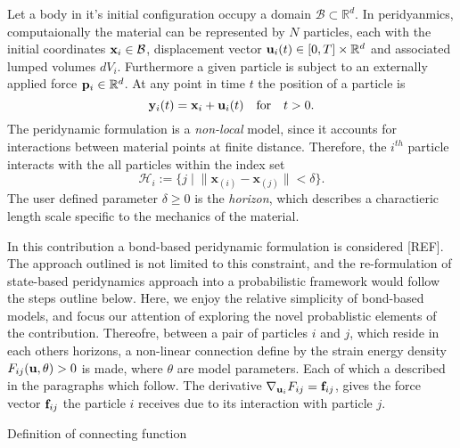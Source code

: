 \documentclass{article}
\begin{document}
\smallskip
Let a body in it's initial configuration occupy a domain $\mathcal B \subset \mathbb R^d$. In peridyanmics, computaionally the material can be represented by $N$ particles, each with the initial coordinates ${\bf x}_i \in \mathcal B$, displacement vector ${\bf u}_i(t) \in [0,T] \times \mathbb R^d$ and associated lumped volumes $dV_i$. Furthermore a given particle is subject to an externally applied force ${\bf p}_i \in \mathbb R^d$. At any point in time $t$ the position of a particle is
$$
{\bf y}_i(t) = {\bf x}_i + {\bf u}_i(t) \quad \mbox{for} \quad t > 0.
$$
The peridynamic formulation is a {\em non-local} model, since it accounts for interactions between material points at finite distance. Therefore, the $i^{th}$ particle interacts with the all particles within the index set
$$
\mathcal H_i := \{ j \; | \; \| \textbf{x}_{(i)} - \textbf{x}_{(j)} \|< \delta \}.
$$
The user defined parameter $\delta \geq 0$ is the {\em horizon}, which describes a charactieric length scale specific to the mechanics of the material.

\smallskip
In this contribution a bond-based peridynamic formulation is considered [REF]. The approach outlined is not limited to this constraint, and the re-formulation of state-based peridynamics approach into a probabilistic framework would follow the steps outline below. Here, we enjoy the relative simplicity of bond-based models, and focus our attention of exploring the novel probablistic elements of the contribution.  Thereofre, between a pair of particles $i$ and $j$, which reside in each others horizons, a non-linear connection define by the strain energy density $F_{ij}({\bf u}, \theta) > 0$ is made, where $\theta$ are model parameters. Each of which a described in the paragraphs which follow. The derivative $\nabla_{{\bf u}_i} F_{ij} = {\bf f}_{ij}$, gives the force vector ${\bf f}_{ij}$ the particle $i$ receives due to its interaction with particle $j$.

{\color{red} Definition of connecting function}
\end{document}

